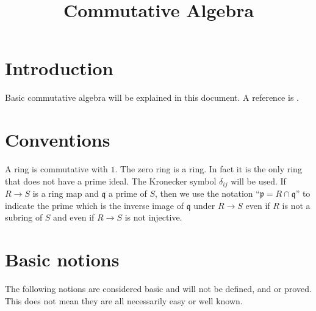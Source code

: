 

%


\title{Commutative Algebra}


\maketitle


\begin{multicols}{2}
\tableofcontents
\end{multicols}




\section{Introduction}
\label{section-introduction}

\noindent
Basic commutative algebra will be explained in this document.
A reference is \cite{MatCA}.






\section{Conventions}
\label{section-conventions}

\noindent
A ring is commutative with $1$. The zero ring is a ring. In fact it is
the only ring that does not have a prime ideal. The Kronecker
symbol $\delta_{ij}$ will be used. If $R \to S$ is a ring map and
$\mathfrak q$ a prime of $S$, then we use the notation
``$\mathfrak p = R \cap \mathfrak q$''
to indicate the prime which is the inverse image of $\mathfrak q$ under
$R \to S$ even if $R$ is not a subring of $S$ and even if $R \to S$
is not injective.






\section{Basic notions}
\label{section-rings-basic}

\noindent
The following notions are considered basic and will not be defined,
and or proved. This does not mean they are all necessarily easy or 
well known.

